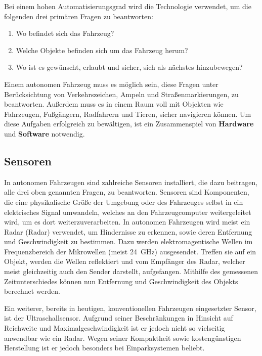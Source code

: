 Bei einem hohen Automatisierungsgrad wird die Technologie verwendet, um die folgenden drei primären Fragen zu beantworten: 
\begin{enumerate}
  \item{Wo befindet sich das Fahrzeug?}
  \item{Welche Objekte befinden sich um das Fahrzeug herum?}
  \item{Wo ist es gewünscht, erlaubt und sicher, sich als nächstes hinzubewegen?}
\end{enumerate}
Einem autonomen Fahrzeug muss es möglich sein, diese Fragen unter Berücksichtung von Verkehrszeichen, Ampeln und Straßenmarkierungen, zu beantworten. Außerdem muss es in einem Raum voll mit Objekten wie Fahrzeugen, Fußgängern, Radfahrern und Tieren, sicher navigieren können. Um diese Aufgaben erfolgreich zu bewältigen, ist ein Zusammenspiel von \textbf{Hardware} und \textbf{Software} notwendig.

\subsection{Sensoren}
In autonomen Fahrzeugen sind zahlreiche Sensoren installiert, die dazu beitragen, alle drei oben genannten Fragen, zu beantworten. Sensoren sind Komponenten, die eine physikalische Größe der Umgebung oder des Fahrzeuges selbst in ein elektrisches Signal umwandeln, welches an den Fahrzeugcomputer weitergeleitet wird, um es dort weiterzuverarbeiten.  In autonomen Fahrzeugen wird meist ein \acs{Radar} (\acl{Radar}) verwendet, um Hindernisse zu erkennen, sowie deren Entfernung und Geschwindigkeit zu bestimmen. Dazu werden elektromagentische Wellen im Frequenzbereich der Mikrowellen (meist \SI{24}{\giga\hertz}) ausgesendet. Treffen sie auf ein Objekt, werden die Wellen reflektiert und vom Empfänger des \acs{Radar}, welcher meist gleichzeitig auch den Sender darstellt, aufgefangen. Mithilfe des gemessenen Zeitunterschiedes können nun Entfernung und Geschwindigkeit des Objekts berechnet werden. 

Ein weiterer, bereits in heutigen, konventionellen Fahrzeugen eingesetzter Sensor, ist der Ultraschallsensor. Aufgrund seiner Beschränkungen in Hinsicht auf Reichweite und Maximalgeschwindigkeit ist er jedoch nicht so vielseitig anwendbar wie ein \acs{Radar}. Wegen seiner Kompaktheit sowie kostengünstigen Herstellung ist er jedoch besonders bei Einparksystemen beliebt.

